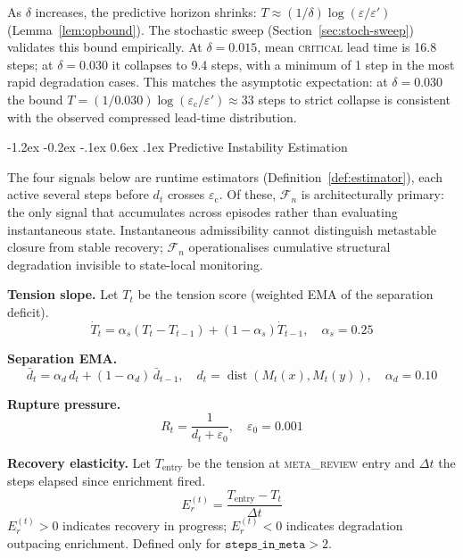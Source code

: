\documentclass{llncs}
\makeatletter
\renewcommand\section{\@startsection{section}{1}{\z@}%
  {-1.2ex \@plus -0.2ex \@minus -.1ex}%
  {0.6ex \@plus .1ex}%
  {\normalfont\large\bfseries}}
\DeclareMathOperator{\dist}{dist}
\newcommand{\ecollapse}{\varepsilon_{\mathrm{c}}}
\newcommand{\st}[1]{\textup{\textsc{#1}}}
\makeatother
\begin{document}
As $\delta$ increases, the predictive horizon shrinks:
$T \approx (1/\delta)\log(\varepsilon/\varepsilon')$
(Lemma~\ref{lem:opbound}). The stochastic sweep
(Section~\ref{sec:stoch-sweep}) validates this bound empirically. At
$\delta = 0.015$, mean \st{critical} lead time is 16.8 steps; at $\delta
= 0.030$ it collapses to 9.4 steps, with a minimum of 1 step in the
most rapid degradation cases. This matches the asymptotic expectation:
at $\delta = 0.030$ the bound $T = (1/0.030)\log(\ecollapse/\varepsilon')
\approx 33$ steps to strict collapse is consistent with the observed
compressed lead-time distribution.

\section{Predictive Instability Estimation}
\label{sec:estimators}

The four signals below are runtime estimators
(Definition~\ref{def:estimator}), each active several steps before
$d_t$ crosses $\ecollapse$. Of these, $\mathcal{F}_n$ is
architecturally primary: the only signal that accumulates across
episodes rather than evaluating instantaneous state. Instantaneous
admissibility cannot distinguish metastable closure from stable
recovery; $\mathcal{F}_n$ operationalises cumulative structural
degradation invisible to state-local monitoring.

\textbf{Tension slope.}
Let $T_t$ be the tension score (weighted EMA of the separation deficit).
\begin{equation}
  \dot{T}_t = \alpha_s (T_t - T_{t-1}) + (1-\alpha_s)\dot{T}_{t-1},
  \quad \alpha_s = 0.25
  \label{eq:slope}
\end{equation}

\textbf{Separation EMA.}
\begin{equation}
  \bar{d}_t = \alpha_d\, d_t + (1-\alpha_d)\,\bar{d}_{t-1},
  \quad d_t = \dist(M_t(x), M_t(y)),
  \quad \alpha_d = 0.10
  \label{eq:sep-ema}
\end{equation}

\textbf{Rupture pressure.}
\begin{equation}
  R_t = \frac{1}{d_t + \varepsilon_0}, \quad \varepsilon_0 = 0.001
  \label{eq:rp}
\end{equation}

\textbf{Recovery elasticity.}
Let $T_{\mathrm{entry}}$ be the tension at \st{meta\_review} entry and
$\Delta t$ the steps elapsed since enrichment fired.
\begin{equation}
  E_r^{(t)} = \frac{T_{\mathrm{entry}} - T_t}{\Delta t}
  \label{eq:elast}
\end{equation}
$E_r^{(t)} > 0$ indicates recovery in progress; $E_r^{(t)} < 0$
indicates degradation outpacing enrichment. Defined only for
$\mathtt{steps\_in\_meta} > 2$.
\end{document}
